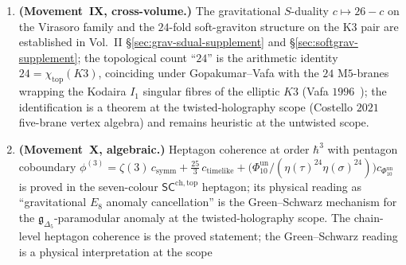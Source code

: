 \begin{remark}
\begin{enumerate}[label=\textup{(\Roman*)}]
 $\Phi_{10}^{\mathrm{un}}(Z)$''
 denotes this identity under the Costello--Gaiotto--Paquette
 twisted-holography dictionary and \emph{not} the Maloney--Witten
 $2009$ sum over smooth Euclidean saddles (BTZ and $\mathrm{SL}(2,
 \mathbb{Z})$-images of thermal $\mathrm{AdS}_3$), which evaluates
 a different formal path integral. The Dijkgraaf--Moore--Verlinde--Verlinde
 $1997$~\cite{DijkgraafMooreVerlindeVerlinde1997} generating
 function counts BPS black-hole microstates of type~IIA on
 $K3 \times T^2$ (equivalently, symmetric-product orbifold
 elliptic genera): this is \emph{also} $1/\Phi_{10}^{\mathrm{un}}(Z)$ by the
 Maldacena--Moore--Strominger $1999$ identification, but it equals
 the twisted-holography boundary character, not the dynamical-metric
 bulk partition function. The three identifications
 (twisted-holography bulk, DVV BPS counting, Maloney--Witten smooth
 saddle sum) coincide at the level of the automorphic form
 $\Phi_{10}^{\mathrm{un}}$ and diverge at the level of what integrates
 to produce it. The twisted-holography identification is proved at the
 factorisation-algebra scope; the Maloney--Witten identification
 requires the full off-shell path integral and remains conjectural.
\item \textbf{(Movement~IX, cross-volume.)} The gravitational
 $S$-duality $c \mapsto 26 - c$ on the Virasoro family and the
 $24$-fold soft-graviton structure on the K3 pair are
 established in Vol.~II
 \S\ref{sec:grav-sdual-supplement} and \S\ref{sec:softgrav-supplement};
 the topological count ``$24$'' is the arithmetic identity
 $24 = \chi_{\mathrm{top}}(K3)$, coinciding under
 Gopakumar--Vafa with the $24$ M$5$-branes wrapping the Kodaira
 $I_1$ singular fibres of the elliptic $K3$
 (Vafa $1996$~\cite{Vafa1996F}); the identification is a theorem
 at the twisted-holography scope (Costello $2021$ five-brane vertex
 algebra) and remains heuristic at the untwisted scope.
\item \textbf{(Movement~X, algebraic.)} Heptagon coherence at order
 $\hbar^3$ with pentagon coboundary
	 $\phi^{(3)} = \zeta(3)\, c_{\mathrm{symm}}
	 + \tfrac{25}{3}\, c_{\mathrm{timelike}}
	 + \bigl(\Phi_{10}^{\mathrm{un}}/(\eta(\tau)^{24}\eta(\sigma)^{24})\bigr)c_{\Phi_{10}^{\mathrm{un}}}$
 is proved in the seven-colour $\mathsf{SC}^{\mathrm{ch,top}}$
 heptagon; its physical reading as ``gravitational $E_8$ anomaly
 cancellation'' is the Green--Schwarz mechanism for the
 $\mathfrak{g}_{\Delta_5}$-paramodular anomaly at the twisted-holography
 scope. The chain-level heptagon coherence is the proved statement;
 the Green--Schwarz reading is a physical interpretation at the scope

\end{enumerate}
\end{remark}
